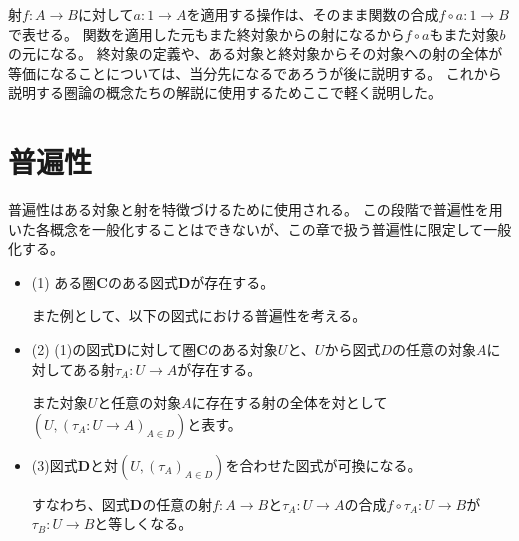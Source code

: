 \documentclass[dvipdfmx]{jsarticle}
\newcommand{\cat}[1]{\boldsymbol{#1}}
\newcommand{\arrow}{\rightarrow}
\newcommand{\mor}[3]{#1:#2\arrow #3}
\begin{document}
	射$\mor{f}{A}{B}$に対して$\mor{a}{1}{A}$を適用する操作は、そのまま関数の合成$\mor{f\circ a}{1}{B}$で表せる。
	関数を適用した元もまた終対象からの射になるから$f\circ a$もまた対象$b$の元になる。
	終対象の定義や、ある対象と終対象からその対象への射の全体が等価になることについては、当分先になるであろうが後に説明する。
	これから説明する圏論の概念たちの解説に使用するためここで軽く説明した。

	\section{普遍性}
	普遍性はある対象と射を特徴づけるために使用される。
	この段階で普遍性を用いた各概念を一般化することはできないが、この章で扱う普遍性に限定して一般化する。
	\begin{itemize}
		\item (1) ある圏$\cat{C}$のある図式$\cat{D}$が存在する。

		また例として、以下の図式における普遍性を考える。
		\begin{center}
		\end{center}
		\item (2) (1)の図式$\cat{D}$に対して圏$\cat{C}$のある対象$U$と、$U$から図式$D$の任意の対象$A$に対してある射$\mor{\tau_A}{U}{A}$が存在する。

		また対象$U$と任意の対象$A$に存在する射の全体を対として$(U,(\mor{\tau_A}{U}{A})_{A\in D})$と表す。
		\begin{center}
		\end{center}
		\item (3)図式$\cat{D}$と対$(U,(\tau_A)_{A\in D})$を合わせた図式が可換になる。

		すなわち、図式$\cat{D}$の任意の射$\mor{f}{A}{B}$と$\mor{\tau_A}{U}{A}$の合成$\mor{f\circ\tau_A}{U}{B}$が$\mor{\tau_B}{U}{B}$と等しくなる。


\end{itemize}
\end{document}
